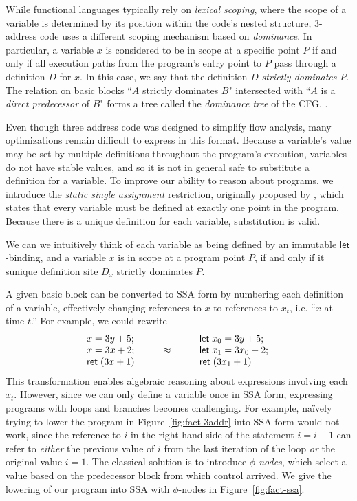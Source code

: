 \documentclass[acmsmall,screen,review]{acmart}
\newcommand{\ms}[1]{\ensuremath{\mathsf{#1}}}
\newcommand{\letexpr}[3]{\ensuremath{\ms{let}\;#1 = #2;\;#3}}
\begin{document}
While functional languages typically rely on \emph{lexical scoping}, where the scope of a variable
is determined by its position within the code's nested structure, 3-address code uses a different
scoping mechanism based on \emph{dominance}. In particular, a variable $x$ is considered to be in
scope at a specific point $P$ if and only if all execution paths from the program's entry point to
$P$ pass through a definition $D$ for $x$. In this case, we say that the definition $D$
\emph{strictly dominates} $P$. The relation on basic blocks ``$A$ strictly dominates $B$"
intersected with ``$A$ is a \emph{direct predecessor} of $B$" forms a tree called the
\emph{dominance tree} of the CFG. %
\cite{cytron-ssa-intro-91}.

Even though three address code was designed to simplify flow analysis, many optimizations remain difficult to express in this format. Because a variable's value may be set by multiple definitions throughout the program's execution, variables do not have stable values, and so it is not in general safe to substitute a definition for a variable. To improve our ability to reason about programs, we introduce the \emph{static single assignment} restriction, originally proposed by \citet{alpern-ssa-original-88}, which states that every variable must be defined at exactly one point in the program. Because there is a unique definition for each variable, substitution is valid.

We can we  intuitively think of each variable as being defined by an immutable \ms{let}-binding, and a variable $x$ is in scope at a program point $P$, if and only if it sunique definition site $D_x$ strictly dominates $P$.

A given basic block can be converted to SSA form by numbering each definition of a variable,
effectively changing references to $x$ to references to $x_t$, i.e. ``$x$ at time $t$.'' For
example, we could rewrite
\begin{equation*}
\begin{array}{lcl}
  x = 3y + 5; & & \letexpr{x_0}{3y + 5}{}  \\
  x = 3x + 2; & \qquad \approx \qquad & \letexpr{x_1}{3x_0 + 2} \\
  \ms{ret}\;(3x + 1) & & \ms{ret}\;(3x_1 + 1)
\end{array}
\end{equation*}
This transformation enables algebraic reasoning about expressions involving each $x_t$. However,
since we can only define a variable once in SSA form, expressing programs with loops and branches
becomes challenging. For example, na\"ively trying to lower the program in
Figure~\ref{fig:fact-3addr} into SSA form would not work, since the reference to $i$ in the right-hand-side of the statement $i = i + 1$ can
refer to \emph{either} the previous value of $i$ from the last iteration of the loop \emph{or} the
original value $i = 1$. The classical solution is to introduce \emph{$\phi$-nodes}, which select a
value based on the predecessor block from which control arrived. We give the lowering of our program
into SSA with $\phi$-nodes in Figure~\ref{fig:fact-ssa}.
\end{document}
